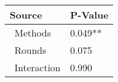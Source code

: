 
\centering
\begin{tabular}{ll}
\toprule
          Source & P-Value \\
\midrule
    \    Methods & 0.049** \\
     \    Rounds &   0.075 \\
\    Interaction &   0.990 \\
\bottomrule
\end{tabular}

